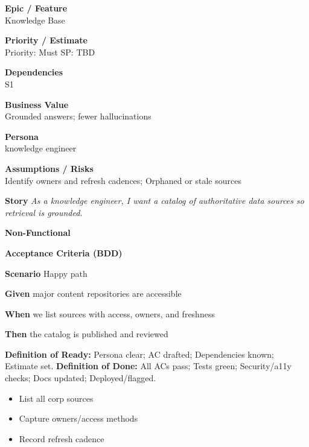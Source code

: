\documentclass[11pt,a4paper]{article}
\newenvironment{StoryCard}[2][]{
  \begin{tcolorbox}[enhanced, breakable, sharp corners=all, colback=cardback, colframe=cardframe,
    title={#2}, fonttitle=\bfseries\large, boxrule=0.6pt, borderline west={2pt}{0pt}{accent}, #1]
}{
  \end{tcolorbox}
}
\newcommand{\badge}[1]{\pill{\footnotesize #1}}
\newcommand{\cb}{\(\square\)}
\newenvironment{TasksBox}[1][Tasks]{%
  \begin{tcolorbox}[enhanced,breakable,
    colback=cardback, colframe=cardframe, title={#1},
    borderline west={1.8pt}{0pt}{MidnightBlue},
    arc=2pt, boxrule=0.4pt,
    left=10pt,right=10pt,top=6pt,bottom=6pt,
    before skip=6pt, after skip=10pt
  ]
  \small
  \begin{itemize}[label=\cb, leftmargin=*, labelsep=0.6em, itemsep=4pt, topsep=2pt, parsep=0pt]
}{%
  \end{itemize}
  \end{tcolorbox}
}
\begin{document}
\begin{StoryCard}{S4 — Source inventory}
\noindent\begin{minipage}[t]{0.49\textwidth}
\textbf{Epic / Feature}\\
Knowledge Base

\medskip
\textbf{Priority / Estimate}\\
Priority: Must \quad SP: TBD

\medskip
\textbf{Dependencies}\\
S1
\end{minipage}\hfill
\begin{minipage}[t]{0.49\textwidth}
\textbf{Business Value}\\
Grounded answers; fewer hallucinations

\medskip
\textbf{Persona}\\
knowledge engineer

\medskip
\textbf{Assumptions / Risks}\\
Identify owners and refresh cadences; Orphaned or stale sources
\end{minipage}

\medskip
\textbf{Story} \emph{As a knowledge engineer, I want a catalog of authoritative data sources so retrieval is grounded.}

\medskip
\textbf{Non-Functional}
\badge{Reliability}\ \badge{Security}

\medskip
\textbf{Acceptance Criteria (BDD)}\par
\textbf{Scenario} Happy path\par
\textbf{Given} major content repositories are accessible\par
\textbf{When} we list sources with access, owners, and freshness\par
\textbf{Then} the catalog is published and reviewed\par
\medskip
\footnotesize \textbf{Definition of Ready:} Persona clear; AC drafted; Dependencies known; Estimate set.\quad
\textbf{Definition of Done:} All ACs pass; Tests green; Security/a11y checks; Docs updated; Deployed/flagged.
\end{StoryCard}

\begin{TasksBox}[Tasks]
  \item List all corp sources
  \item Capture owners/access methods
  \item Record refresh cadence
\end{TasksBox}
\clearpage
\end{document}
